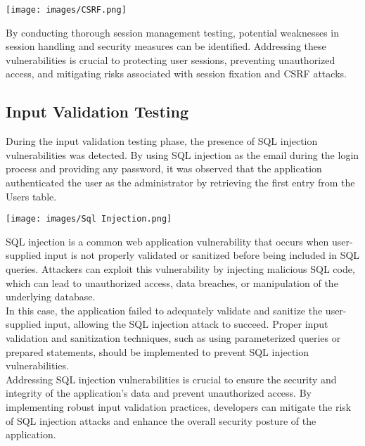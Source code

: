 \documentclass[12pt]{article}
\begin{document}
\begin{center}
    \texttt{[image: images/CSRF.png]}
\end{center}

By conducting thorough session management testing, potential weaknesses in session handling and security measures can be identified. Addressing these vulnerabilities is crucial to protecting user sessions, preventing unauthorized access, and mitigating risks associated with session fixation and CSRF attacks.

\newpage

\subsection{Input Validation Testing}
During the input validation testing phase, the presence of SQL injection vulnerabilities was detected. By using SQL injection as the email during the login process and providing any password, it was observed that the application authenticated the user as the administrator by retrieving the first entry from the Users table.

\begin{center}
    \texttt{[image: images/Sql Injection.png]}
\end{center}



SQL injection is a common web application vulnerability that occurs when user-supplied input is not properly validated or sanitized before being included in SQL queries. Attackers can exploit this vulnerability by injecting malicious SQL code, which can lead to unauthorized access, data breaches, or manipulation of the underlying database.\\

In this case, the application failed to adequately validate and sanitize the user-supplied input, allowing the SQL injection attack to succeed. Proper input validation and sanitization techniques, such as using parameterized queries or prepared statements, should be implemented to prevent SQL injection vulnerabilities.\\

Addressing SQL injection vulnerabilities is crucial to ensure the security and integrity of the application's data and prevent unauthorized access. By implementing robust input validation practices, developers can mitigate the risk of SQL injection attacks and enhance the overall security posture of the application.
\end{document}
